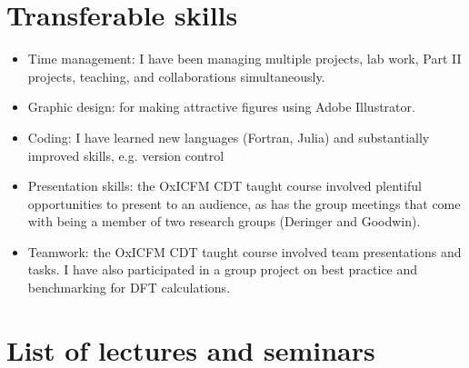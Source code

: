\documentclass[12pt,a4paper,twoside,nobind]{ociamthesis}
\begin{document}
\section*{Transferable skills}
\begin{itemize}
  \item Time management: I have been managing multiple projects, lab work, Part II projects, teaching, and collaborations simultaneously.
  \item Graphic design: for making attractive figures using Adobe Illustrator.
  \item Coding: I have learned new languages (Fortran, Julia) and substantially improved skills, e.g. version control
  \item Presentation skills: the OxICFM CDT taught course involved plentiful opportunities to present to an audience, as has the group meetings that come with being a member of two research groups (Deringer and Goodwin).
  \item Teamwork: the OxICFM CDT taught course involved team presentations and tasks. I have also participated in a group project on best practice and benchmarking for DFT calculations.
\end{itemize}

\section*{List of lectures and seminars}
\end{document}

